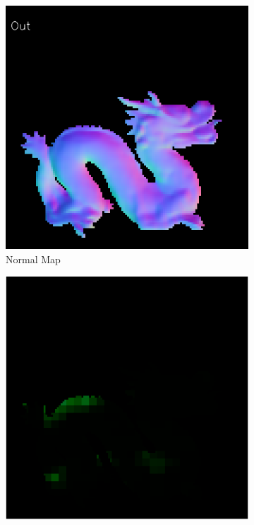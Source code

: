 \begin{figure}[H]
	\centering
	\captionsetup{width=\linewidth}
	\begin{subfigure}[b]{0.19\linewidth}
		\includegraphics[width=\linewidth]{./Figures/feature_map_gcnn/feature_map_out_gcnn-noc.png}
		\caption{Normal Map}
	\end{subfigure}
	\begin{subfigure}[b]{0.19\linewidth}
		\includegraphics[width=\linewidth]{./Figures/feature_map_gcnn/feature_map_gcnn-noc_39.png}

\end{subfigure}
\end{figure}
